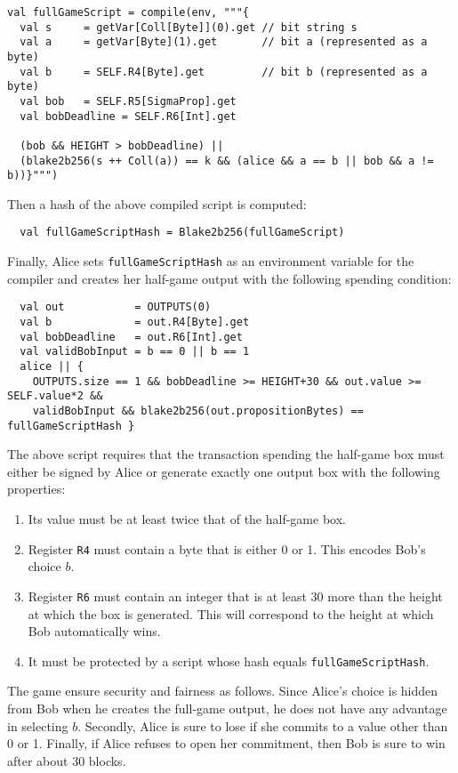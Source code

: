 \documentclass[11pt]{article}
\begin{document}
\begin{verbatim}
val fullGameScript = compile(env, """{
  val s     = getVar[Coll[Byte]](0).get // bit string s 
  val a     = getVar[Byte](1).get       // bit a (represented as a byte)
  val b     = SELF.R4[Byte].get         // bit b (represented as a byte)
  val bob   = SELF.R5[SigmaProp].get
  val bobDeadline = SELF.R6[Int].get 
   
  (bob && HEIGHT > bobDeadline) || 
  (blake2b256(s ++ Coll(a)) == k && (alice && a == b || bob && a != b))}""")
\end{verbatim}

Then a hash of the above compiled script is computed:

\begin{verbatim}
  val fullGameScriptHash = Blake2b256(fullGameScript)
\end{verbatim}

Finally, Alice sets \texttt{fullGameScriptHash} as an environment variable for the compiler and creates her half-game output with the following spending condition:

\begin{verbatim}
  val out           = OUTPUTS(0) 
  val b             = out.R4[Byte].get
  val bobDeadline   = out.R6[Int].get
  val validBobInput = b == 0 || b == 1
  alice || {
    OUTPUTS.size == 1 && bobDeadline >= HEIGHT+30 && out.value >= SELF.value*2 &&
    validBobInput && blake2b256(out.propositionBytes) == fullGameScriptHash }
\end{verbatim}

The above script requires that the transaction spending the half-game box must either be signed by Alice or generate exactly one output box with the following properties:

\begin{enumerate}
	\item Its value must be at least twice that of the half-game box.
	\item Register \texttt{R4} must contain a byte that is either 0 or 1. This encodes Bob's choice $b$.
	\item Register \texttt{R6} must contain an integer that is at least 30 more than the height at which the box is generated. This will correspond to the height at which Bob automatically wins.
	\item It must be protected by a script whose hash equals \texttt{fullGameScriptHash}.
\end{enumerate}
 
The game ensure security and fairness as follows. Since Alice's choice is hidden from Bob when he creates the full-game output, he does not have any advantage in selecting $b$. Secondly, Alice is sure to lose if she commits to a value other than 0 or 1. Finally, if Alice refuses to open her commitment, then Bob is sure to win after about 30 blocks. 
\end{document}
